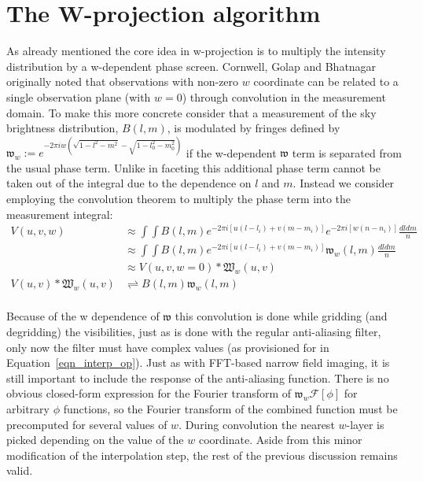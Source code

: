 \section{The W-projection algorithm}
As already mentioned the core idea in w-projection is to multiply the intensity distribution by a w-dependent phase screen. Cornwell, Golap and Bhatnagar \cite{cornwell2008noncoplanar}
originally noted that observations with non-zero $w$ coordinate can be related to a single observation plane (with $w=0$) through convolution in the measurement domain. To make this
more concrete consider that a measurement of the sky brightness distribution, $B(l,m)$, is modulated by fringes defined by $\mathfrak{w}_w := e^{-2\pi i w(\sqrt{1-l^2-m^2}-\sqrt{1-l_0^2-m_0^2})}$ if the 
w-dependent $\mathfrak{w}$ term is separated from the usual phase term. Unlike in faceting this additional phase term cannot be taken out of the integral due to the dependence on $l$ and $m$. Instead
we consider employing the convolution theorem to multiply the phase term into the measurement integral:
\begin{equation}
 \begin{split}
        V(u,v,w)&\approx\int{\int{B(l,m)e^{-2{\pi}i[u(l-l_i)+v(m-m_i)]}e^{-2{\pi}i[w(n-n_i)]}\frac{dldm}{n}}}\\
		&\approx\int{\int{B(l,m)e^{-2{\pi}i[u(l-l_i)+v(m-m_i)]}\mathfrak{w}_w(l,m)\frac{dldm}{n}}}\\
		&\approx V(u,v,w=0)*\mathfrak{W}_w(u,v)\\
	V(u,v) * \mathfrak{W}_w(u,v) &\rightleftharpoons B(l,m)\mathfrak{w}_w(l,m)\\
 \end{split}
\end{equation}

Because of the w dependence of $\mathfrak{w}$ this convolution is done while gridding (and degridding) the visibilities, just as is done with the regular 
anti-aliasing filter, only now the filter must have complex values (as provisioned for in Equation~\ref{eqn_interp_op}). Just as with FFT-based narrow 
field imaging, it is still important to include the response of the anti-aliasing function. There is no obvious closed-form expression for the 
Fourier transform of $\mathfrak{w}_w\mathcal{F}[\phi]$ for arbitrary $\phi$ functions, so the Fourier transform of the combined function must be precomputed 
for several values of $w$. During convolution the nearest $w$-layer is picked depending on the value of the $w$ coordinate. Aside from this minor modification 
of the interpolation step, the rest of the previous discussion remains valid.

